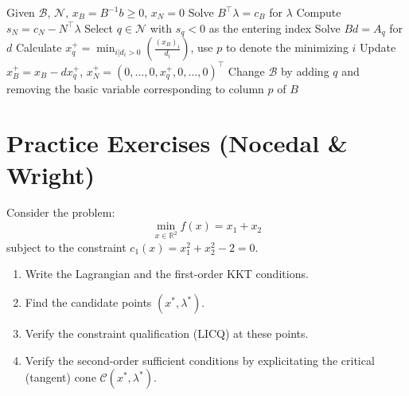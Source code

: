 \begin{algorithm}[H]
\caption{One step of the Simplex Method}
\label{alg:simplex}
Given $\mathcal{B}$, $\mathcal{N}$, $x_B = B^{-1}b \ge 0$, $x_N = 0$\;
Solve $B^\top\lambda = c_B$ for $\lambda$\;
Compute $s_N = c_N - N^\top\lambda$\; 
Select $q \in \mathcal{N}$ with $s_q < 0$ as the entering index\;
Solve $Bd = A_q$ for $d$\;
Calculate $x_q^+ = \min_{i|d_i>0}\left(\frac{(x_B)_i}{d_i}\right)$, use $p$ to denote the minimizing $i$\;
Update $x_B^+ = x_B - dx_q^+$, $x_N^+ = (0, \ldots, 0, x_q^+, 0, \ldots, 0)^\top$\;
Change $\mathcal{B}$ by adding $q$ and removing the basic variable corresponding to column $p$ of $B$\;
\end{algorithm}


\section{Practice Exercises (Nocedal \& Wright)}
\label{sec:8.exercises}

\bigskip
\begin{exercice}
Consider the problem:
$$ \min_{x \in \mathbb{R}^2} f(x) = x_1 + x_2 $$
subject to the constraint $c_1(x) = x_1^2 + x_2^2 - 2 = 0$.
\begin{enumerate}
    \item Write the Lagrangian and the first-order KKT conditions.
    \item Find the candidate points $(x^*, \lambda^*)$.
    \item Verify the constraint qualification (LICQ) at these points.
    \item Verify the second-order sufficient conditions by explicitating the critical (tangent) cone $\mathcal{C}(x^*, \lambda^*)$.
\end{enumerate}
\end{exercice}

